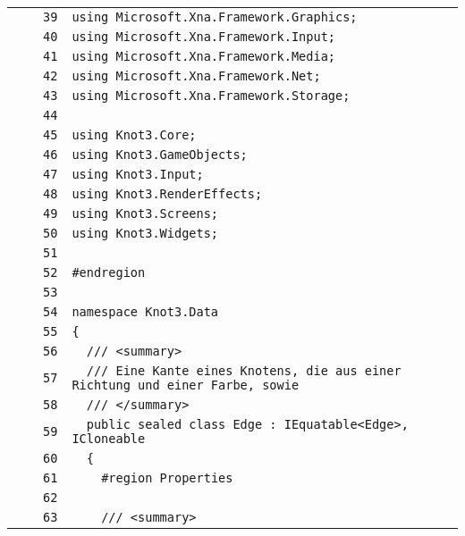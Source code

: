 \documentclass[a4paper,10pt]{article}
\begin{document}
\begin{longtable}[l]{lrrl}
\cellcolor{gray} &  & \verb~39~ & \verb~using Microsoft.Xna.Framework.Graphics;~\\
\cellcolor{gray} &  & \verb~40~ & \verb~using Microsoft.Xna.Framework.Input;~\\
\cellcolor{gray} &  & \verb~41~ & \verb~using Microsoft.Xna.Framework.Media;~\\
\cellcolor{gray} &  & \verb~42~ & \verb~using Microsoft.Xna.Framework.Net;~\\
\cellcolor{gray} &  & \verb~43~ & \verb~using Microsoft.Xna.Framework.Storage;~\\
\cellcolor{gray} &  & \verb~44~ & \verb~~\\
\cellcolor{gray} &  & \verb~45~ & \verb~using Knot3.Core;~\\
\cellcolor{gray} &  & \verb~46~ & \verb~using Knot3.GameObjects;~\\
\cellcolor{gray} &  & \verb~47~ & \verb~using Knot3.Input;~\\
\cellcolor{gray} &  & \verb~48~ & \verb~using Knot3.RenderEffects;~\\
\cellcolor{gray} &  & \verb~49~ & \verb~using Knot3.Screens;~\\
\cellcolor{gray} &  & \verb~50~ & \verb~using Knot3.Widgets;~\\
\cellcolor{gray} &  & \verb~51~ & \verb~~\\
\cellcolor{gray} &  & \verb~52~ & \verb~#endregion~\\
\cellcolor{gray} &  & \verb~53~ & \verb~~\\
\cellcolor{gray} &  & \verb~54~ & \verb~namespace Knot3.Data~\\
\cellcolor{gray} &  & \verb~55~ & \verb~{~\\
\cellcolor{gray} &  & \verb~56~ & \verb~  /// <summary>~\\
\cellcolor{gray} &  & \verb~57~ & \verb~  /// Eine Kante eines Knotens, die aus einer Richtung und einer Farbe, sowie ~\\
\cellcolor{gray} &  & \verb~58~ & \verb~  /// </summary>~\\
\cellcolor{gray} &  & \verb~59~ & \verb~  public sealed class Edge : IEquatable<Edge>, ICloneable~\\
\cellcolor{gray} &  & \verb~60~ & \verb~  {~\\
\cellcolor{gray} &  & \verb~61~ & \verb~    #region Properties~\\
\cellcolor{gray} &  & \verb~62~ & \verb~~\\
\cellcolor{gray} &  & \verb~63~ & \verb~    /// <summary>~\\

\end{longtable}
\end{document}
